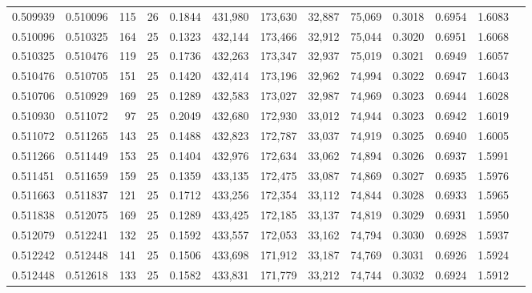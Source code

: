 \begin{tabular}{rrrrrrrrrrrrr}
0.509939 & 0.510096 &   115 &  26 &                                     0.1844 & 431,980 & 173,630 &  32,887 &  75,069 & 0.3018 & 0.6954 & 1.6083 \\
0.510096 & 0.510325 &   164 &  25 &                                     0.1323 & 432,144 & 173,466 &  32,912 &  75,044 & 0.3020 & 0.6951 & 1.6068 \\
0.510325 & 0.510476 &   119 &  25 &                                     0.1736 & 432,263 & 173,347 &  32,937 &  75,019 & 0.3021 & 0.6949 & 1.6057 \\
0.510476 & 0.510705 &   151 &  25 &                                     0.1420 & 432,414 & 173,196 &  32,962 &  74,994 & 0.3022 & 0.6947 & 1.6043 \\
0.510706 & 0.510929 &   169 &  25 &                                     0.1289 & 432,583 & 173,027 &  32,987 &  74,969 & 0.3023 & 0.6944 & 1.6028 \\
0.510930 & 0.511072 &    97 &  25 &                                     0.2049 & 432,680 & 172,930 &  33,012 &  74,944 & 0.3023 & 0.6942 & 1.6019 \\
0.511072 & 0.511265 &   143 &  25 &                                     0.1488 & 432,823 & 172,787 &  33,037 &  74,919 & 0.3025 & 0.6940 & 1.6005 \\
0.511266 & 0.511449 &   153 &  25 &                                     0.1404 & 432,976 & 172,634 &  33,062 &  74,894 & 0.3026 & 0.6937 & 1.5991 \\
0.511451 & 0.511659 &   159 &  25 &                                     0.1359 & 433,135 & 172,475 &  33,087 &  74,869 & 0.3027 & 0.6935 & 1.5976 \\
0.511663 & 0.511837 &   121 &  25 &                                     0.1712 & 433,256 & 172,354 &  33,112 &  74,844 & 0.3028 & 0.6933 & 1.5965 \\
0.511838 & 0.512075 &   169 &  25 &                                     0.1289 & 433,425 & 172,185 &  33,137 &  74,819 & 0.3029 & 0.6931 & 1.5950 \\
0.512079 & 0.512241 &   132 &  25 &                                     0.1592 & 433,557 & 172,053 &  33,162 &  74,794 & 0.3030 & 0.6928 & 1.5937 \\
0.512242 & 0.512448 &   141 &  25 &                                     0.1506 & 433,698 & 171,912 &  33,187 &  74,769 & 0.3031 & 0.6926 & 1.5924 \\
0.512448 & 0.512618 &   133 &  25 &                                     0.1582 & 433,831 & 171,779 &  33,212 &  74,744 & 0.3032 & 0.6924 & 1.5912 \\

\end{tabular}
